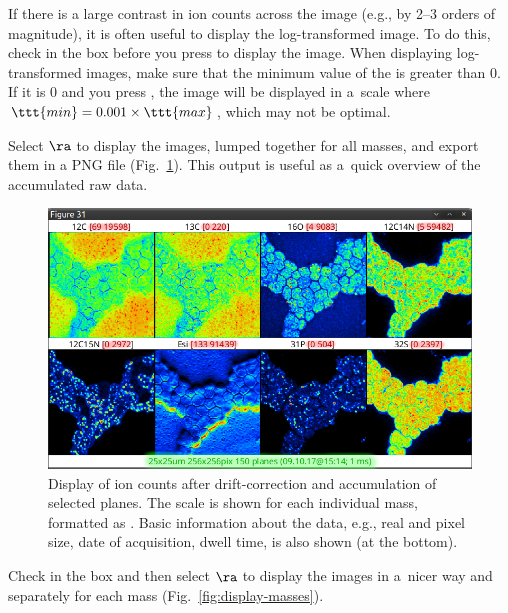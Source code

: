 \bul If there is a large contrast in ion counts across the image (e.g., by 2--3 orders of magnitude), it is often useful to display the log-transformed image. To do this, check  in the  box before you press  to display the image. When displaying log-transformed images, make sure that the minimum value of the  is greater than 0. If it is 0 and you press , the image will be displayed in a~scale where $\ttt{min} = 0.001\times\ttt{max}$, which may not be optimal.

\s Select  $\ra$  to display the images, lumped together for all masses, and export them in a PNG file (Fig.~\ref{fig:display-accu-planes}). This output is useful as a~quick overview of the accumulated raw data.

\begin{figure}[!ht]
\centering
\includegraphics[width=\textwidth]{figs3/LANS-display-accu-planes}
\caption{\label{fig:display-accu-planes}%
Display of ion counts after drift-correction and accumulation of selected planes. The scale is shown for each individual mass, formatted as . Basic information about the data, e.g., real and pixel size, date of acquisition, dwell time, is also shown (at the bottom).}
\end{figure}

\s Check  in the  box and then select  $\ra$  to display the images in a~nicer way and separately for each mass (Fig.~\ref{fig:display-masses}). 

